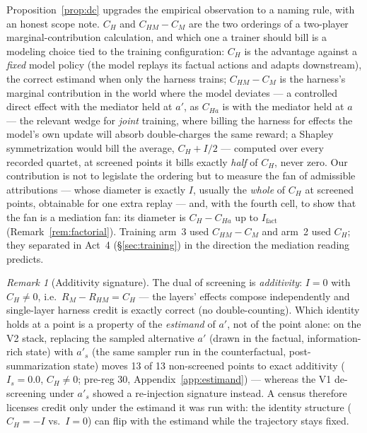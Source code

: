 \documentclass{article}
\theoremstyle{remark}
\newtheorem{remark}{Remark}
\begin{document}
Proposition~\ref{prop:dc} upgrades the empirical observation to a
naming rule, with an honest scope note. $C_H$ and $C_{HM} - C_M$ are
the two orderings of a two-player marginal-contribution calculation, and
which one a trainer should bill is a modeling choice tied to the training
configuration: $C_H$ is the advantage against a \emph{fixed} model policy
(the model replays its factual actions and adapts downstream), the correct
estimand when only the harness trains; $C_{HM} - C_M$ is the harness's
marginal contribution in the world where the model deviates --- a
controlled direct effect with the mediator held at $a'$, as $C_{Ha}$ is
with the mediator held at $a$ --- the relevant wedge for \emph{joint}
training, where billing the harness for effects the model's own update
will absorb double-charges the same reward; a
Shapley symmetrization would bill the average, $C_H + I/2$ --- computed
over every recorded quartet, at screened points it bills exactly
\emph{half} of $C_H$, never zero. Our contribution is not to legislate
the ordering but to measure the fan of admissible attributions --- whose
diameter is exactly $I$, usually the \emph{whole} of $C_H$ at screened
points, obtainable for one extra replay --- and, with the fourth cell, to
show that the fan is a mediation fan: its diameter is $C_H - C_{Ha}$ up
to $I_{\text{fact}}$ (Remark~\ref{rem:factorial}). Training arm~3 used
$C_{HM} - C_M$ and arm~2 used $C_H$; they separated in Act~4
(\S\ref{sec:training}) in the direction the mediation reading predicts.

\begin{remark}[Additivity signature]
\label{rem:additivity}
The dual of screening is \emph{additivity}: $I = 0$ with $C_H \neq 0$,
i.e.\ $R_M - R_{HM} = C_H$ --- the layers' effects compose independently
and single-layer harness credit is exactly correct (no double-counting).
Which identity holds at a point is a property of the \emph{estimand} of
$a'$, not of the point alone: on the V2 stack, replacing the sampled
alternative $a'$ (drawn in the factual, information-rich state) with
$a'_s$ (the same sampler run in the counterfactual, post-summarization
state) moves 13 of 13 non-screened points to exact additivity ($I_s =
0.0$, $C_H \neq 0$; pre-reg 30, Appendix~\ref{app:estimand}) --- whereas
the V1 de-screening under $a'_s$ showed a re-injection signature instead.
A census therefore licenses credit only under the estimand it was run
with: the identity structure ($C_H = -I$ vs.\ $I = 0$) can flip with the
estimand while the trajectory stays fixed.
\end{remark}
\end{document}
